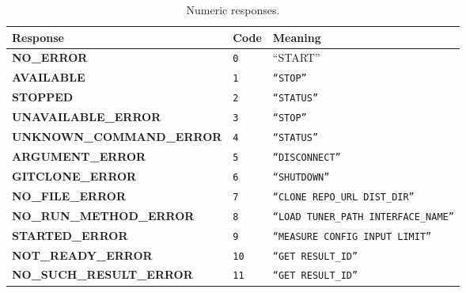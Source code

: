 \newcommand{\specialcell}[2][c]{%
  \begin{tabular}[#1]{@{}K@{}}#2\end{tabular}}


\begin{table}[htpb]
    \centering
    \tiny
    \begin{tabular}{@{}KTL@{}}
        \toprule
        {\bf Response} & {\bf Code} & {\bf Meaning} \\ \midrule
        {\tiny \bf NO\_ERROR} & 
        {\tiny \tt 0} & 
        {\tiny ``START''} \\ \midrule
        {\tiny \bf AVAILABLE} & 
        {\tiny \tt 1} & 
        {\tiny \tt ``STOP''} \\ \midrule
        {\tiny \bf STOPPED} & 
        {\tiny \tt 2} & 
        {\tiny \tt ``STATUS''} \\ \midrule
        {\tiny \bf UNAVAILABLE\_ERROR} & 
        {\tiny \tt 3} & 
        {\tiny \tt ``STOP''} \\ \midrule
        {\tiny \bf UNKNOWN\_COMMAND\_ERROR} & 
        {\tiny \tt 4} & 
        {\tiny \tt ``STATUS''} \\ \midrule
        {\tiny \bf ARGUMENT\_ERROR} & 
        {\tiny \tt 5} & 
        {\tiny \tt ``DISCONNECT''} \\ \midrule
        {\tiny \bf GITCLONE\_ERROR} & 
        {\tiny \tt 6} & 
        {\tiny \tt ``SHUTDOWN''} \\ \midrule
        {\tiny \bf NO\_FILE\_ERROR} & 
        {\tiny \tt 7} & 
        {\tiny \tt ``CLONE REPO\_URL DIST\_DIR''} \\ \midrule
        {\tiny \bf NO\_RUN\_METHOD\_ERROR} & 
        {\tiny \tt 8} & 
        {\tiny \tt ``LOAD TUNER\_PATH INTERFACE\_NAME''} \\ \midrule
        {\tiny \bf STARTED\_ERROR} & 
        {\tiny \tt 9} & 
        {\tiny \tt ``MEASURE CONFIG INPUT LIMIT''} \\ \midrule
        {\tiny \bf NOT\_READY\_ERROR} & 
        {\tiny \tt 10} & 
        {\tiny \tt ``GET RESULT\_ID''} \\ \midrule
        {\tiny \bf NO\_SUCH\_RESULT\_ERROR} & 
        {\tiny \tt 11} & 
        {\tiny \tt ``GET RESULT\_ID''} \\ \bottomrule
    \end{tabular}
    \caption{Numeric responses.}
    \label{tab:protocol-errors}
\end{table}
